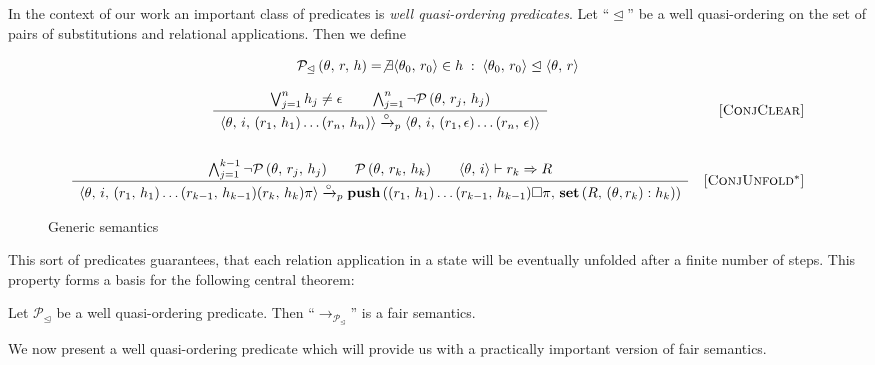 In the context of our work an important class of predicates is \emph{well quasi-ordering predicates}. Let ``$\trianglelefteq$'' be a well quasi-ordering on the set of
pairs of substitutions and relational applications. Then we define

\[
\mathcal{P}_\trianglelefteq\,(\theta,\,r,\,h) = \not\exists\langle \theta_0,\,r_0 \rangle\in h\;:\; \langle \theta_0,\,r_0 \rangle\trianglelefteq \langle \theta,\,r \rangle
\]

\begin{figure*}[t]
\[\begin{array}{cr}
      \dfrac
      {
      \bigvee_{j=1}^n h_j \not= \epsilon \qquad
      \bigwedge_{j=1}^n \neg\mathcal{P}\,(\theta,\,r_j,\,h_j)
      }
      {\begin{array}{l}
      \langle \theta,\, i,\, (r_1,\,h_1) \ldots (r_n,\,h_n) \rangle \xrightarrow{\circ}_p \langle \theta,\, i,\, (r_1,\epsilon) \ldots (r_n,\, \epsilon) \rangle
      \end{array}}
      &  \mbox{[\textsc{ConjClear}]} \\[10mm]
      \dfrac
      {
       \bigwedge_{j=1}^{k-1} \neg\mathcal{P}\,(\theta,\, r_j,\, h_j) \qquad
       \mathcal{P}\,(\theta,\, r_k,\, h_k) \qquad
       \langle \theta,\, i \rangle \vdash r_k \Rightarrow R 
      }
      {
        \begin{array}{l}
          \langle \theta,\, i,\, (r_1,\,h_1) \ldots (r_{k-1},\,h_{k-1}) (r_k,\, h_k) \pi \rangle \xrightarrow{\circ}_p \mbox{\bf push}\,((r_1,\,h_1) \ldots (r_{k-1},\,h_{k-1})\Box \pi,\, \mbox{\bf set}\,(R, \, (\theta, r_k) : h_k))
         \end{array}
        }
&     \mbox{[\textsc{ConjUnfold$^*$}]} 
\end{array}\]
\caption{Generic semantics}
\label{fair:pred-fair-semantics}
\end{figure*}

This sort of predicates guarantees, that each relation application in a state will be eventually unfolded after a finite number of steps. This property
forms a basis for the following central theorem:

\begin{theorem}
  \label{thm:main}
  Let $\mathcal{P}_\trianglelefteq$ be a well quasi-ordering predicate. Then ``$\rightarrow_{\mathcal{P}_\trianglelefteq}$'' is a fair semantics.
\end{theorem}

We now present a well quasi-ordering predicate which will provide us with a practically important version of fair semantics. 

